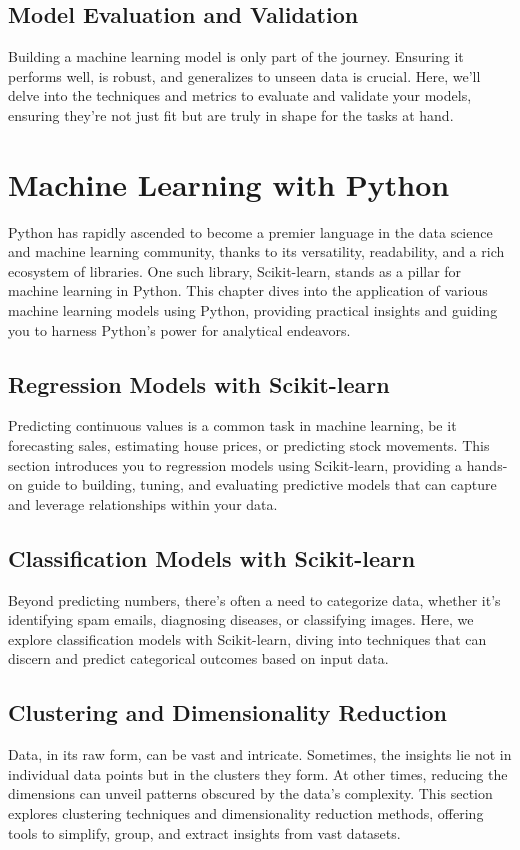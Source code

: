 \documentclass{book}
\begin{document}
\section{Model Evaluation and Validation}
Building a machine learning model is only part of the journey. Ensuring it performs well, is robust, and generalizes to unseen data is crucial. Here, we'll delve into the techniques and metrics to evaluate and validate your models, ensuring they're not just fit but are truly in shape for the tasks at hand.

\chapter{Machine Learning with Python}
Python has rapidly ascended to become a premier language in the data science and machine learning community, thanks to its versatility, readability, and a rich ecosystem of libraries. One such library, Scikit-learn, stands as a pillar for machine learning in Python. This chapter dives into the application of various machine learning models using Python, providing practical insights and guiding you to harness Python's power for analytical endeavors.

\section{Regression Models with Scikit-learn}
Predicting continuous values is a common task in machine learning, be it forecasting sales, estimating house prices, or predicting stock movements. This section introduces you to regression models using Scikit-learn, providing a hands-on guide to building, tuning, and evaluating predictive models that can capture and leverage relationships within your data.

\section{Classification Models with Scikit-learn}
Beyond predicting numbers, there's often a need to categorize data, whether it's identifying spam emails, diagnosing diseases, or classifying images. Here, we explore classification models with Scikit-learn, diving into techniques that can discern and predict categorical outcomes based on input data.

\section{Clustering and Dimensionality Reduction}
Data, in its raw form, can be vast and intricate. Sometimes, the insights lie not in individual data points but in the clusters they form. At other times, reducing the dimensions can unveil patterns obscured by the data's complexity. This section explores clustering techniques and dimensionality reduction methods, offering tools to simplify, group, and extract insights from vast datasets.
\end{document}
